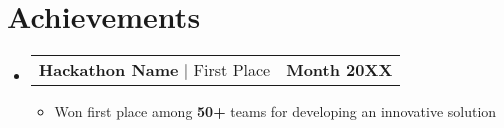 \documentclass[letterpaper,11pt]{article}
\makeatletter
\newcommand{\resumeItem}[1]{
    \item\small{
        {#1 \vspace{-2pt}}
    }
    }
\newcommand{\resumeProjectHeading}[2]{
        \item
        \begin{tabular*}{1.001\textwidth}{l@{\extracolsep{\fill}}r}
        \small#1 & \textbf{\small #2}\\
        \end{tabular*}\vspace{-7pt}
    }
\newcommand{\resumeSubHeadingListStart}{\begin{itemize}[leftmargin=0.0in, label={}]}
\newcommand{\resumeSubHeadingListEnd}{\end{itemize}}
\newcommand{\resumeItemListStart}{\begin{itemize}}
\newcommand{\resumeItemListEnd}{\end{itemize}\vspace{-5pt}}
\makeatother
\begin{document}
    \section{Achievements}
        \resumeSubHeadingListStart
            \resumeProjectHeading
                {\textbf{Hackathon Name} $|$ First Place}{Month 20XX}
                \resumeItemListStart
                    \resumeItem{Won first place among \textbf{50+} teams for developing an innovative solution}
                \resumeItemListEnd
        \resumeSubHeadingListEnd
    \vspace{-5pt}

    
\end{document}
